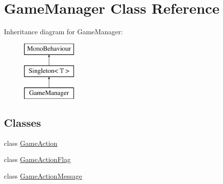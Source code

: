\hypertarget{class_game_manager}{\section{Game\-Manager Class Reference}
\label{class_game_manager}
}
Inheritance diagram for Game\-Manager\-:\begin{figure}[H]
\begin{center}
\leavevmode
\includegraphics[height=3.000000cm]{class_game_manager}
\end{center}
\end{figure}
\subsection*{Classes}
\begin{DoxyCompactItemize}
\item 
class \hyperlink{class_game_manager_1_1_game_action}{Game\-Action}
\item 
class \hyperlink{class_game_manager_1_1_game_action_flag}{Game\-Action\-Flag}
\item 
class \hyperlink{class_game_manager_1_1_game_action_message}{Game\-Action\-Message}
\end{DoxyCompactItemize}
